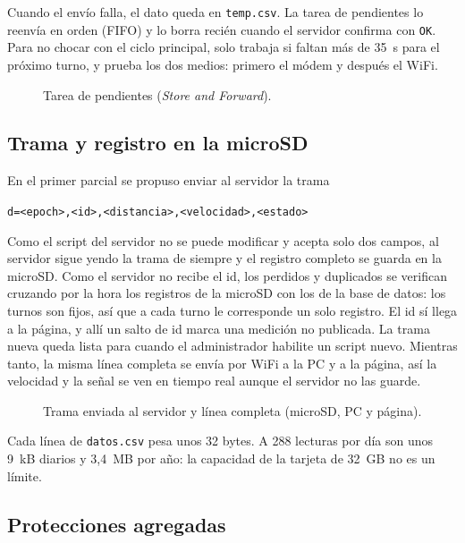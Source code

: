 \documentclass[11pt,a4paper]{article}
\begin{document}
Cuando el envío falla, el dato queda en \texttt{temp.csv}. La tarea de
pendientes lo reenvía en orden (FIFO) y lo borra recién cuando el servidor
confirma con \texttt{OK}. Para no chocar con el ciclo principal, solo trabaja
si faltan más de 35~s para el próximo turno, y prueba los dos medios: primero
el módem y después el WiFi.

\begin{figure}[!htbp]
    \centering
    \resizebox{0.78\textwidth}{!}{}
    \caption{Tarea de pendientes (\emph{Store and Forward}).}
\end{figure}

\subsection{Trama y registro en la microSD}
\label{sec:trama}

En el primer parcial se propuso enviar al servidor la trama
\begin{center}\texttt{d=<epoch>,<id>,<distancia>,<velocidad>,<estado>}\end{center}
Como el script del
servidor no se puede modificar y acepta solo dos campos, al servidor
sigue yendo la trama de siempre y el registro completo se guarda en la
microSD. Como el servidor no recibe el id, los perdidos y duplicados se
verifican cruzando por la hora los registros de la microSD con los de
la base de datos: los turnos son fijos, así que a cada turno le corresponde un
solo registro. El id sí llega a la página, y allí un salto de id marca una
medición no publicada. La trama nueva queda lista para cuando el administrador habilite
un script nuevo. Mientras tanto, la misma línea completa se envía por WiFi a la
PC y a la página, así la velocidad y la señal se ven en tiempo real aunque el
servidor no las guarde.

\begin{figure}[!htbp]
    \centering
    
    \caption{Trama enviada al servidor y línea completa (microSD, PC y página).}
\end{figure}

Cada línea de \texttt{datos.csv} pesa unos 32 bytes. A 288 lecturas por día son
unos 9~kB diarios y 3,4~MB por año: la capacidad de la tarjeta de 32~GB no es
un límite.

\subsection{Protecciones agregadas}
\end{document}
